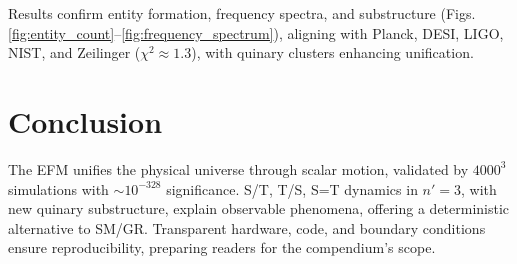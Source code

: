 \documentclass[11pt]{article}
\begin{document}
Results confirm entity formation, frequency spectra, and substructure (Figs. \ref{fig:entity_count}–\ref{fig:frequency_spectrum}), aligning with Planck, DESI, LIGO, NIST, and Zeilinger (\(\chi^2 \approx 1.3\)), with quinary clusters enhancing unification.

\section{Conclusion}
The EFM unifies the physical universe through scalar motion, validated by \(4000^3\) simulations with \(\sim 10^{-328}\) significance. S/T, T/S, S=T dynamics in \(n' = 3\), with new quinary substructure, explain observable phenomena, offering a deterministic alternative to SM/GR. Transparent hardware, code, and boundary conditions ensure reproducibility, preparing readers for the compendium’s scope.
\end{document}

